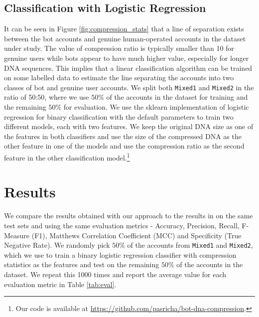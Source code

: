 \documentclass{llncs}
\begin{document}

\subsection{Classification with Logistic Regression}
It can be seen in Figure \ref{fig:compression_stats} that a line of separation exists between the bot accounts and genuine human-operated accounts in the dataset under study. The value of compression ratio is typically smaller than 10 for genuine users while bots appear to have much higher value, especially for longer DNA sequences. This implies that a linear classification algorithm can be trained on some labelled data to estimate the line separating the accounts into two classes of bot and genuine user accounts. We split both \texttt{Mixed1} and \texttt{Mixed2} in the ratio of 50:50, where we use $50\%$ of the accounts in the dataset for training and the remaining $50\%$ for evaluation. We use the sklearn \cite{scikit-learn} implementation of logistic regression for binary classification with the default parameters to train two different models, each with two features. We keep the original DNA size as one of the features in both classifiers and use the size of the compressed DNA as the other feature in one of the models and use the compression ratio as the second feature in the other classification model.\footnote{Our code is available at \url{https://github.com/pasricha/bot-dna-compression}.}

\section{Results}

We compare the results obtained with our approach to the results in \cite{7876716} on the same test sets and using the same evaluation metrics - Accuracy, Precision, Recall, F-Measure (F1), Matthews Correlation Coefficient (MCC) and Specificity (True Negative Rate). We randomly pick $50\%$ of the accounts from \texttt{Mixed1} and \texttt{Mixed2}, which we use to train a binary logistic regression classifier with compression statistics as the features and test on the remaining $50\%$ of the accounts in the dataset. We repeat this 1000 times and report the average value for each evaluation metric in Table \ref{tab:eval}.
\end{document}
